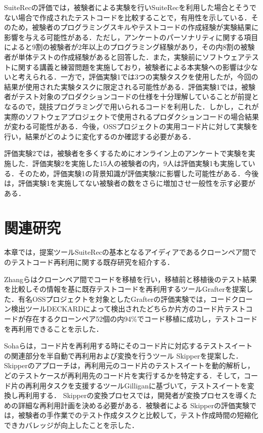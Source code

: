 \documentclass[12pt]{jarticle} %
\begin{document}
{\sf SuiteRec}の評価では，被験者による実験を行い{\sf SuiteRec}を利用した場合とそうでない場合で作成されたテストコードを比較することで，有用性を示している．そのため，被験者のプログラミングスキルやテストコードの作成経験が実験結果に影響を与える可能性がある．ただし，アンケートのパーソナリティに関する項目によると9割の被験者が2年以上のプログラミング経験があり，その内8割の被験者が単体テストの作成経験があると回答した．また，実験前にソフトウェアテストに関する講義と練習問題を実施しており，被験者による本実験への影響は少ないと考えられる．一方で，評価実験1では3つの実験タスクを使用したが，今回の結果が使用された実験タスクに限定される可能性がある．評価実験1では，被験者がテスト対象のプロダクションコードの仕様を十分理解していることが前提となるので，競技プログラミングで用いられるコードを利用した．しかし，これが実際のソフトウェアプロジェクトで使用されるプロダクションコードの場合結果が変わる可能性がある．今後，OSSプロジェクトの実用コード片に対して実験を行い，結果がどのように変化するのか確認する必要がある．

評価実験2では，被験者を多くするためにオンライン上のアンケートで実験を実施した．評価実験2を実施した15人の被験者の内，9人は評価実験1も実施している．そのため，評価実験1の背景知識が評価実験2に影響した可能性がある．今後は，評価実験1を実施してない被験者の数をさらに増加させ一般性を示す必要がある．




\newpage
\section{関連研究}
本章では，提案ツール{\sf SuiteRec}の基本となるアイディアであるクローンペア間でのテストコード再利用に関する既存研究を紹介する．

Zhangら\cite{Zhang2017}はクローンペア間でコードを移植を行い，移植前と移植後のテスト結果を比較しその情報を基に既存テストコードを再利用するツール{\sf Grafter}を提案した．有名OSSプロジェクトを対象とした{\sf Grafter}の評価実験では，コードクローン検出ツール{\sf DECKARD}\cite{Jiang2007}によって検出されたどちらか片方のコード片テストコードが存在するクローンペア52個の内94\%でコード移植に成功し，テストコードを再利用できることを示した．

Sohaら\cite{skipper}は，コード片を再利用する時にそのコード片に対応するテストスイートの関連部分を半自動で再利用および変換を行うツール{ \sf Skipper}を提案した．{ \sf Skipper}のアプローチは，再利用元のコード片のテストスイートを動的解析し，どのテストケースが再利用先のコード片を実行するかを特定する．そして，コード片の再利用タスクを支援するツール{\sf Gilligan}\cite{gilligan10,gilligan34}に基づいて，テストスイートを変換し再利用する．{ \sf Skipper}の変換プロセスでは，開発者が変換プロセスを導くための詳細な再利用計画を決める必要がある．被験者による{ \sf Skipper}の評価実験では，被験者の手作業でのテスト作成タスクと比較して，テスト作成時間の短縮化できカバレッジが向上したことを示した．
\end{document}
